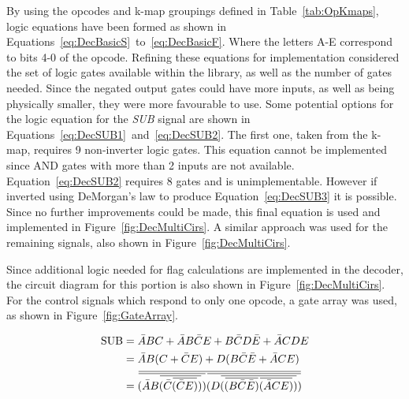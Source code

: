 By using the opcodes and k-map groupings defined in Table~\ref{tab:OpKmaps}, logic equations have been formed as shown in Equations~\eqref{eq:DecBasicS}~to~\eqref{eq:DecBasicF}. 
Where the letters A-E correspond to bits 4-0 of the opcode. 
Refining these equations for implementation considered the set of logic gates available within the library, as well as the number of gates needed. 
Since the negated output gates could have more inputs, as well as being physically smaller, they were more favourable to use. 
Some potential options for the logic equation for the \textit{SUB} signal are shown in Equations~\eqref{eq:DecSUB1}~and~\eqref{eq:DecSUB2}. 
The first one, taken from the k-map, requires 9 non-inverter logic gates. 
This equation cannot be implemented since AND gates with more than 2 inputs are not available. 
Equation~\eqref{eq:DecSUB2} requires 8 gates and is unimplementable. 
However if inverted using DeMorgan's law to produce Equation~\eqref{eq:DecSUB3} it is possible.
Since no further improvements could be made, this final equation is used and implemented in Figure~\ref{fig:DecMultiCirs}. A similar approach was used for the remaining signals, also shown in Figure~\ref{fig:DecMultiCirs}. 

Since additional logic needed for flag calculations are implemented in the decoder, the circuit diagram for this portion is also shown in Figure~\ref{fig:DecMultiCirs}. For the control signals which respond to only one opcode, a gate array was used, as shown in Figure~\ref{fig:GateArray}. 

\newcommand{\overbar}[1]{\mkern 1.5mu\overline{\mkern-1.5mu#1\mkern-1.5mu}\mkern 1.5mu}
\begin{align}
	\text{SUB} &= \bar{A}BC + \bar{A}B\bar{C}E + B\bar{C}D\bar{E} + \bar{A}CDE \label{eq:DecSUB1}\\
	&= \bar{A}B(C + \bar{C}E) + D(B\bar{C}\bar{E} + \bar{A}CE) \label{eq:DecSUB2}\\
	&= \overbar{\overbar{(\bar{A}B\overbar{(\bar{C}\overbar{(\bar{C}E)})})}\overbar{(D\overbar{(\overbar{(B\bar{C}\bar{E})}\overbar{(\bar{A}CE)})})}} \label{eq:DecSUB3}
\end{align}

